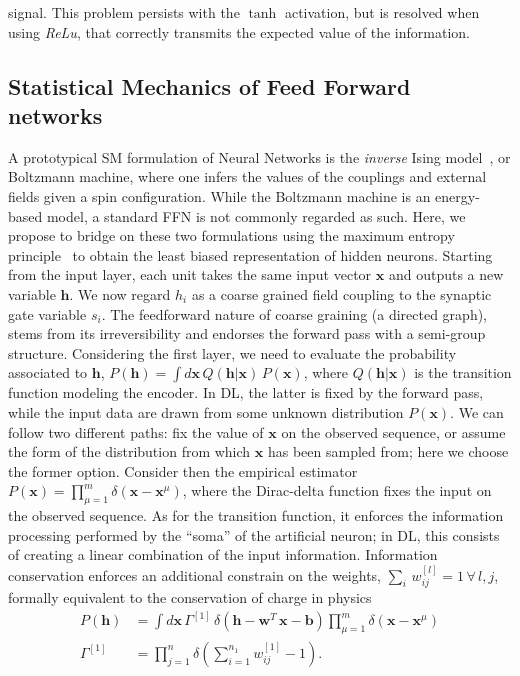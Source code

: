 \documentclass{article}
\begin{document}
signal. This problem persists with the $\tanh$ activation, but is resolved when using {\it ReLu}, that correctly transmits the expected value of the information.

\subsection{Statistical Mechanics of Feed Forward networks}

A prototypical SM formulation of Neural Networks is the {\it inverse} Ising model~\cite{zecchina}, or Boltzmann machine, where one infers the values of the couplings and external fields given a spin configuration.  While the Boltzmann machine is an energy-based model, a standard FFN is not commonly regarded as such. Here, we propose to bridge on these two formulations using the maximum entropy principle~\cite{zecchina, roberto, mckay, jaynes} to obtain the least biased representation of hidden neurons. Starting from the input layer, each unit takes the same input vector $\mathbf{x}$ and outputs a new variable $\mathbf{h}$. We now regard $h_i$ as a coarse grained field coupling to the synaptic gate variable $s_i$. The feedforward nature of coarse graining (a directed graph), stems from its irreversibility and endorses the forward pass with a semi-group structure. Considering the first layer, we need to evaluate the probability associated to  $\mathbf{h}$, $P(\mathbf{h}) =  \int d \mathbf{x} \, Q(\mathbf{h} | \mathbf{x} ) \, P(\mathbf{x})$, where  $Q(\mathbf{h} | \mathbf{x} )$ is the transition function modeling the encoder. In DL, the latter is fixed by the forward pass, while the input data are drawn from some unknown distribution $P(\mathbf{x})$. We can follow two different paths: fix the value of $\mathbf{x}$ on the observed sequence, or assume the form of the distribution from which $\mathbf{x}$ has been sampled from; here we choose the former option. Consider then the empirical estimator $P(\mathbf{x}) =  \prod_{\mu=1}^m  \delta( \mathbf{x} - \mathbf{x}^{\mu} )$, where the Dirac-delta function  fixes the input on the observed sequence. As for the transition function, it enforces the information processing performed by the ``soma'' of the artificial neuron; in DL, this consists of creating a linear combination of the input information. Information conservation enforces an additional constrain on the weights, $\sum_i \, w_{ij}^{[l]} =1 \, \forall \, l,j$, formally equivalent to the conservation of charge in physics
%
\begin{align} \label{eq:ps2}
P(\mathbf{h}) &= \int {d\mathbf{x}} \, \Gamma^{[1]} \, \delta\left( \mathbf{h} -  \mathbf{w}^{T} \, \mathbf{x} - \mathbf{b} \right) \prod_{\mu =1}^m  \delta ( \mathbf{x} - \mathbf{x}^{\mu} ) \\ \nonumber
\Gamma^{[1]} &= \prod_{j=1}^n \delta\left( \sum_{i=1}^{n_1} w_{ij}^{[1]} -1 \right).
\end{align}
\end{document}
